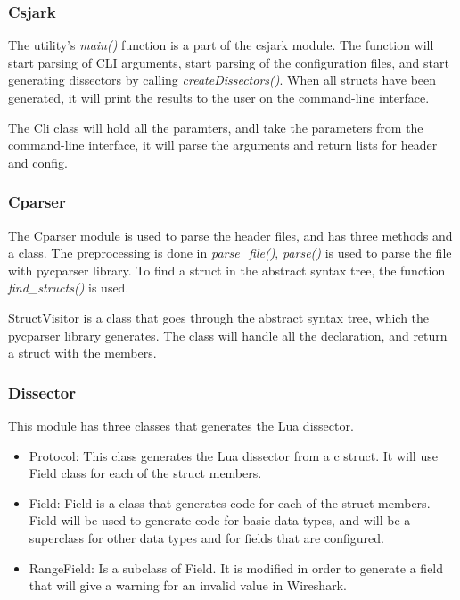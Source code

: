 \subsubsection{Csjark}
The utility's \emph{main()} function is a part of the csjark module. The function will start parsing of CLI arguments, start parsing of the configuration files, and start generating dissectors by calling \emph{createDissectors()}. When all structs have been generated, it will print the results to the user on the command-line interface.

The Cli class will hold all the paramters, andl take the parameters from the command-line interface, it will parse the arguments and return lists for header and config.

\subsubsection{Cparser}
The Cparser module is used to parse the header files, and has three methods and a class. The preprocessing is done in \emph{parse\_file()}, \emph{parse()} is used to parse the file with pycparser library. To find a struct in the abstract syntax tree, the function \emph{find\_structs()} is used.

StructVisitor is a class that goes through the abstract syntax tree, which the pycparser library generates. The class will handle all the declaration, and return a struct with the members.

\subsubsection{Dissector}
This module has three classes that generates the Lua dissector.

\begin{itemize}
	\item Protocol: This class generates the Lua dissector from a \Gls{c} struct. It will use Field class for each of the struct members.
	\item Field: Field is a class that generates code for each of the struct members. Field will be used to generate code for basic data types, and will be a superclass for other data types and for fields that are configured.
	\item RangeField: Is a subclass of Field. It is modified in order to generate a field that will give a warning for an invalid value in Wireshark.
\end{itemize}

